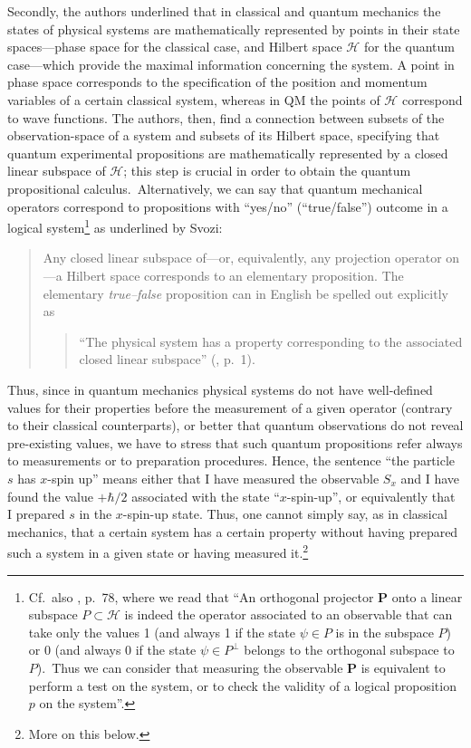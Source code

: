 \documentclass[11pt, executivepaper]{article}
\begin{document}
Secondly, the authors underlined that in classical and quantum mechanics the states of physical systems are mathematically represented by points in their state spaces---phase space for the classical case, and Hilbert space $\mathcal{H}$ for the quantum case---which provide the maximal information concerning the system. A point in phase space corresponds to the specification of the position and momentum variables of a certain classical system, whereas in QM the points of $\mathcal{H}$ correspond to wave functions. The authors, then, find a connection between subsets of the observation-space of a system and subsets of its Hilbert space, specifying that quantum experimental propositions are mathematically represented by a closed linear subspace of $\mathcal{H}$; this step is crucial in order to obtain the quantum propositional calculus.\ Alternatively, we can say that quantum mechanical operators correspond to propositions with ``yes/no'' (``true/false'') outcome in a logical system\footnote{Cf.\ also \cite{David:2015}, p.\ 78, where we read that ``An orthogonal projector $\textbf{P}$ onto a linear subspace $P\subset\mathcal{H}$ is indeed the operator associated to an observable that can take only the values 1 (and always 1 if the state $\psi\in P$ is in the subspace $P$) or 0 (and always 0 if the state $\psi\in P^{\perp}$ belongs to the orthogonal subspace to $P$).\ Thus we can consider that measuring the observable $\textbf{P}$ is equivalent to perform a test on the system, or to check the validity of a logical proposition $p$ on the system''.} as underlined by Svozi:
\begin{quote}
Any closed linear subspace of---or, equivalently, any projection operator on---a Hilbert space corresponds to an elementary
proposition. The elementary \emph{true--false} proposition can in English be spelled out explicitly as
\begin{quote}
``The physical system has a property corresponding to the associated closed linear subspace'' (\cite{Svozi:1999}, p.\ 1).
\end{quote}
\end{quote}

Thus, since in quantum mechanics physical systems do not have well-defined values for their properties before the measurement of a given operator (contrary to their classical counterparts), or better that quantum observations do not reveal pre-existing values, we have to stress that such quantum propositions refer always to measurements or to preparation procedures. Hence, the sentence ``the particle $s$ has $x$-spin up'' means either that I have measured the observable $S_x$ and I have found the value $+\hbar/2$ associated with the state ``$x$-spin-up'', or equivalently that I prepared $s$ in the $x$-spin-up state. Thus, one cannot simply say, as in classical mechanics, that a certain system has a certain property without having prepared such a system in a given state or having measured it.\footnote{More on this below.}
\end{document}
